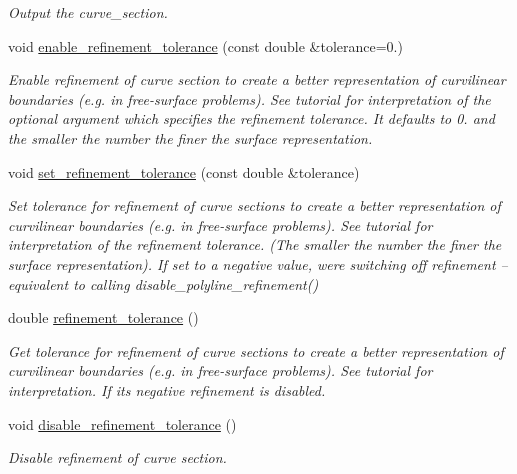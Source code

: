 \begin{DoxyCompactItemize}
\begin{DoxyCompactList}\small\item\em Output the curve\+\_\+section. \end{DoxyCompactList}\item 
void \hyperlink{classoomph_1_1TriangleMeshCurveSection_ab16b55ff3346ea87b00a49ead7562cc2}{enable\+\_\+refinement\+\_\+tolerance} (const double \&tolerance=0.)
\begin{DoxyCompactList}\small\item\em Enable refinement of curve section to create a better representation of curvilinear boundaries (e.\+g. in free-\/surface problems). See tutorial for interpretation of the optional argument which specifies the refinement tolerance. It defaults to 0. and the smaller the number the finer the surface representation. \end{DoxyCompactList}\item 
void \hyperlink{classoomph_1_1TriangleMeshCurveSection_a3ebe8f25753aefe11af4aa8081644462}{set\+\_\+refinement\+\_\+tolerance} (const double \&tolerance)
\begin{DoxyCompactList}\small\item\em Set tolerance for refinement of curve sections to create a better representation of curvilinear boundaries (e.\+g. in free-\/surface problems). See tutorial for interpretation of the refinement tolerance. (The smaller the number the finer the surface representation). If set to a negative value, we\textquotesingle{}re switching off refinement -- equivalent to calling disable\+\_\+polyline\+\_\+refinement() \end{DoxyCompactList}\item 
double \hyperlink{classoomph_1_1TriangleMeshCurveSection_a77470b1ea748cef82a3ffebfd568fe7d}{refinement\+\_\+tolerance} ()
\begin{DoxyCompactList}\small\item\em Get tolerance for refinement of curve sections to create a better representation of curvilinear boundaries (e.\+g. in free-\/surface problems). See tutorial for interpretation. If it\textquotesingle{}s negative refinement is disabled. \end{DoxyCompactList}\item 
void \hyperlink{classoomph_1_1TriangleMeshCurveSection_a88a139cf580b5cd694dd2a69ef372a0d}{disable\+\_\+refinement\+\_\+tolerance} ()
\begin{DoxyCompactList}\small\item\em Disable refinement of curve section. \end{DoxyCompactList}\item 

\end{DoxyCompactItemize}
